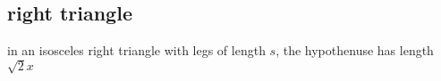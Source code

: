 \subsection{right triangle}

\begin{center}
in an isosceles right triangle with legs of length \( s \), the hypothenuse has length \( \sqrt{2}x \)
\end{center}
